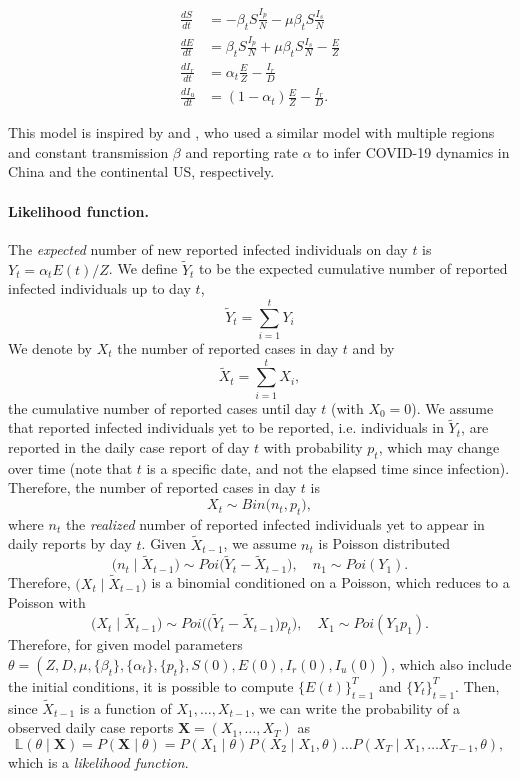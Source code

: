 \documentclass[12pt]{extarticle}
\let\vec\mathbf
\begin{document}
\begin{equation}
\begin{aligned}
\frac{dS}{dt} & = -\beta_t S \frac{I_p}{N} - \mu \beta_t S \frac{I_s}{N} \\
\frac{dE}{dt} & = \beta_t S \frac{I_p}{N} + \mu \beta_t S \frac{I_s}{N}  - \frac{E}{Z} \\
\frac{dI_r}{dt} & = \alpha_t \frac{E}{Z} - \frac{I_r}{D} \\
\frac{dI_u}{dt} & = (1-\alpha_t) \frac{E}{Z} - \frac{I_r}{D} .
\end{aligned}
\end{equation}

This model is inspired by \citet{Li2020} and \citet{Pei2020}, who used a similar model with multiple regions and constant transmission $\beta$ and reporting rate $\alpha$ to infer COVID-19 dynamics in China and the continental US, respectively.

\paragraph*{Likelihood function.}
The \emph{expected} number of new reported infected individuals on day $t$ is $Y_t= \alpha_t E(t)/Z$.
We define $\tilde{Y}_t$ to be the expected cumulative number of reported infected individuals up to day $t$,
$$
\tilde{Y}_t = \sum_{i=1}^{t}{Y_i}
$$
We denote by $X_t$ the number of reported cases in day $t$ and by 
$$
\tilde{X}_t=\sum_{i=1}^{t}X_i,
$$
the cumulative number of reported cases until day $t$ (with $X_0=0$).
We assume that reported infected individuals yet to be reported, i.e. individuals in $\tilde{Y}_t$, are reported in the daily case report of day $t$ with probability $p_t$, which may change over time (note that $t$ is a specific date, and not the elapsed time since infection).
Therefore, the number of reported cases in day $t$ is
$$
X_t \sim \mathit{Bin}\big(n_t, p_t\big),
$$
where $n_t$ the \emph{realized} number of reported infected individuals yet to appear in daily reports by day $t$.
Given $\tilde{X}_{t-1}$, we assume $n_t$ is Poisson distributed
$$
\big(n_t \mid \tilde{X}_{t-1}\big) \sim \mathit{Poi}\Big( \tilde{Y}_t - \tilde{X}_{t-1} \Big), \quad n_1 \sim \mathit{Poi}(Y_1).
$$ 
Therefore, $\big(X_t \mid \tilde{X}_{t-1} \big)$ is a binomial conditioned on a Poisson, which reduces to a Poisson with
$$
\big(X_t \mid \tilde{X}_{t-1} \big) \sim \mathit{Poi}\Big( \big( \tilde{Y}_t - \tilde{X}_{t-1} \big)p_t \Big), \quad X_1 \sim \mathit{Poi}(Y_1 p_1).
$$
Therefore, for given model parameters $\theta=(Z, D, \mu, \{\beta_t\}, \{\alpha_t\}, \{p_t\}, S(0), E(0), I_r(0), I_u(0))$, which also include the initial conditions, it is possible to compute $\{E(t)\}_{t=1}^{T}$ and $\{Y_t\}_{t=1}^{T}$. Then, since $\tilde{X}_{t-1}$ is a function of $X_1, \ldots, X_{t-1}$, we can write the probability of a observed daily case reports $\vec{X} = (X_1, \ldots, X_T)$ as 
\begin{equation} \label{eq:likelihood}
\mathbb{L}(\theta \mid \vec{X}) = P(\vec{X} \mid \theta) = P(X_1 \mid \theta) P(X_2 \mid X_1, \theta) \ldots P(X_T \mid X_1, \ldots X_{T-1}, \theta),
\end{equation}
which is a \emph{likelihood function}.
\end{document}
